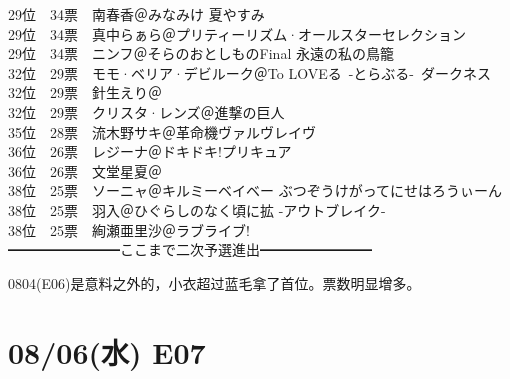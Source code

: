 {    29位　34票　南春香＠みなみけ 夏やすみ\\
    29位　34票　真中らぁら＠プリティーリズム·オールスターセレクション\\
    29位　34票　ニンフ＠そらのおとしものFinal 永遠の私の鳥籠\\
    32位　29票　モモ·ベリア·デビルーク＠To LOVEる~-とらぶる-~ダークネス\\
    32位　29票　針生えり＠\Saki\\
    32位　29票　クリスタ·レンズ＠進撃の巨人\\
    35位　28票　流木野サキ＠革命機ヴァルヴレイヴ\\
    36位　26票　レジーナ＠ドキドキ!プリキュア\\
    36位　26票　文堂星夏＠\Saki\\
    38位　25票　ソーニャ＠キルミーベイベー ぶつぞうけがってにせはろうぃーん\\
    38位　25票　羽入＠ひぐらしのなく頃に拡 -アウトブレイク-\\
    38位　25票　絢瀬亜里沙＠ラブライブ!\\
    ━━━━━━━━ここまで二次予選進出━━━━━━━━
}

0804(E06)是意料之外的，小衣超过蓝毛拿了首位。票数明显增多。

\section{08/06(水) E07}


